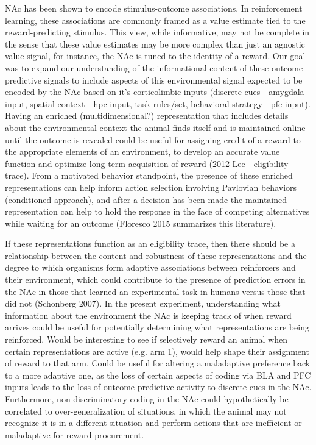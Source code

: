 \documentclass[11pt]{article}
\begin{document}
NAc has been shown to encode stimulus-outcome associations. In reinforcement learning, these associations are commonly framed as a value estimate tied to the reward-predicting stimulus. This view, while informative, may not be complete in the sense that these value estimates may be more complex than just an agnostic value signal, for instance, the NAc is tuned to the identity of a reward. Our goal was to expand our understanding of the informational content of these outcome-predictive signals to include aspects of this environmental signal expected to be encoded by the NAc based on it’s corticolimbic inputs (discrete cues - amygdala input, spatial context - hpc input, task rules/set, behavioral strategy - pfc input). Having an enriched (multidimensional?) representation that includes details about the environmental context the animal finds itself and is maintained online until the outcome is revealed could be useful for assigning credit of a reward to the appropriate elements of an environment, to develop an accurate value function and optimize long term acquisition of reward (2012 Lee - eligibility trace). From a motivated behavior standpoint, the presence of these enriched representations can help inform action selection involving Pavlovian behaviors (conditioned approach), and after a decision has been made the maintained representation can help to hold the response in the face of competing alternatives while waiting for an outcome (Floresco 2015 summarizes this literature). 

If these representations function as an eligibility trace, then there should be a relationship between the content and robustness of these representations and the degree to which organisms form adaptive associations between reinforcers and their environment, which could contribute to the presence of prediction errors in the NAc in those that learned an experimental task in humans versus those that did not (Schonberg 2007). In the present experiment, understanding what information about the environment the NAc is keeping track of when reward arrives could be useful for potentially determining what representations are being reinforced. Would be interesting to see if selectively reward an animal when certain representations are active (e.g. arm 1), would help shape their assignment of reward to that arm. Could be useful for altering a maladaptive preference back to a more adaptive one, as the loss of certain aspects of coding via BLA and PFC inputs leads to the loss of outcome-predictive activity to discrete cues in the NAc. Furthermore, non-discriminatory coding in the NAc could hypothetically be correlated to over-generalization of situations, in which the animal may not recognize it is in a different situation and perform actions that are inefficient or maladaptive for reward procurement.  
\end{document}
